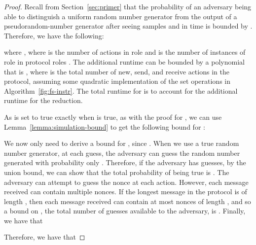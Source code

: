 \begin{proof}
Recall from Section~\ref{sec:primer} that the probability of an adversary being
able to distinguish a uniform random number generator from the output of a
pseudorandom-number generator  after seeing  samples and in
time  is bounded by
.
Therefore, we have the following:

where , where  is the number of  actions in
role  and  is the number of instances of role  in protocol roles . The additional runtime 
can be bounded by a polynomial that is , where  is
the total number of
new, send, and receive actions in the protocol, assuming some quadratic implementation
of the set operations in Algorithm~\ref{fig:fs-instr}.
The total runtime for  is  to account for the additional
runtime for the reduction.

As  is set to true exactly when  is
true, as with the proof for , we can use Lemma~\ref{lemma:simulation-bound}
to get the following bound for :


We now only need to derive a bound for
, since
.
When we use a true random number generator, at each guess, the adversary can
guess the random number generated with probability only . Therefore,
if the adversary has  guesses, by the union bound, we can show that the total
probability of  being true is .  The adversary can attempt to
guess the nonce at each  action. However, each message received
can contain multiple nonces. If the longest message in the protocol is of
length , then each message received can contain at most  nonces of
length , and so a bound on , the total number of guesses available to
the adversary, is . Finally, we have that

Therefore, we have that

\end{proof}

